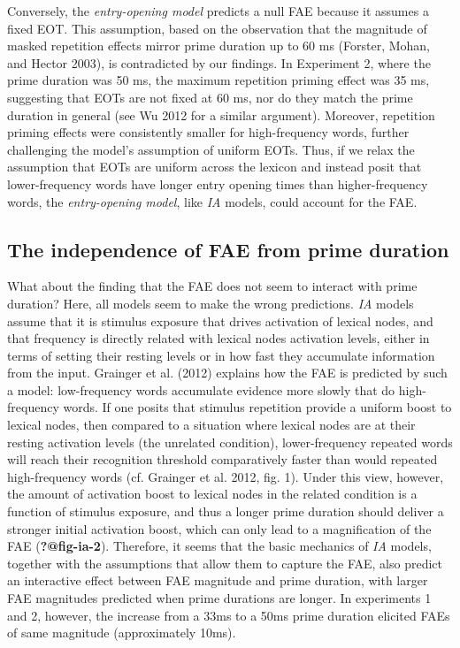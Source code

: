 \documentclass[
]{interact}
\begin{document}
Conversely, the \emph{entry-opening model} predicts a null FAE because
it assumes a fixed EOT. This assumption, based on the observation that
the magnitude of masked repetition effects mirror prime duration up to
60 ms (Forster, Mohan, and Hector 2003), is contradicted by our
findings. In Experiment 2, where the prime duration was 50 ms, the
maximum repetition priming effect was 35 ms, suggesting that EOTs are
not fixed at 60 ms, nor do they match the prime duration in general (see
Wu 2012 for a similar argument). Moreover, repetition priming effects
were consistently smaller for high-frequency words, further challenging
the model's assumption of uniform EOTs. Thus, if we relax the assumption
that EOTs are uniform across the lexicon and instead posit that
lower-frequency words have longer entry opening times than
higher-frequency words, the \emph{entry-opening model}, like \emph{IA}
models, could account for the FAE.

\subsection{The independence of FAE from prime
duration}\label{the-independence-of-fae-from-prime-duration}

What about the finding that the FAE does not seem to interact with prime
duration? Here, all models seem to make the wrong predictions. \emph{IA}
models assume that it is stimulus exposure that drives activation of
lexical nodes, and that frequency is directly related with lexical nodes
activation levels, either in terms of setting their resting levels or in
how fast they accumulate information from the input. Grainger et al.
(2012) explains how the FAE is predicted by such a model: low-frequency
words accumulate evidence more slowly that do high-frequency words. If
one posits that stimulus repetition provide a uniform boost to lexical
nodes, then compared to a situation where lexical nodes are at their
resting activation levels (the unrelated condition), lower-frequency
repeated words will reach their recognition threshold comparatively
faster than would repeated high-frequency words (cf. Grainger et al.
2012, fig. 1). Under this view, however, the amount of activation boost
to lexical nodes in the related condition is a function of stimulus
exposure, and thus a longer prime duration should deliver a stronger
initial activation boost, which can only lead to a magnification of the
FAE (\textbf{?@fig-ia-2}). Therefore, it seems that the basic mechanics
of \emph{IA} models, together with the assumptions that allow them to
capture the FAE, also predict an interactive effect between FAE
magnitude and prime duration, with larger FAE magnitudes predicted when
prime durations are longer. In experiments 1 and 2, however, the
increase from a 33ms to a 50ms prime duration elicited FAEs of same
magnitude (approximately 10ms).
\end{document}
